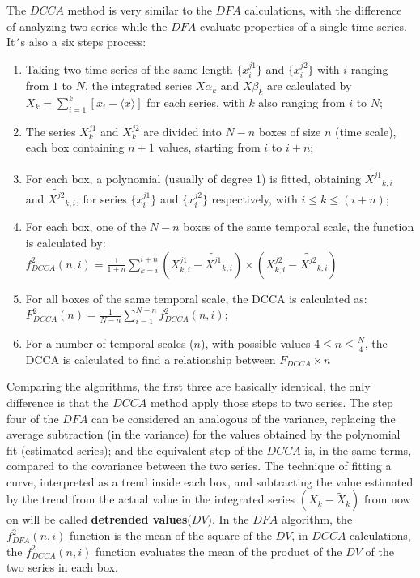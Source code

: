\documentclass[nojss]{jss}
\begin{document}
The $DCCA$ method is very similar to the $DFA$ calculations, with the difference of analyzing two series while the $DFA$ evaluate properties of a single time series. It´s also a six steps process:


\begin{enumerate}
  \label{steps:DCCA}
  \item Taking two time series of the same length $\{x^{j1}_{i}\}$ and $\{x^{j2}_{i}\}$ with $i$ ranging from $1$ to $N$, the integrated series $X\alpha_{k}$ and $X\beta_{k}$ are calculated by
  $X_{k} = \sum_{i=1}^{k}\left[x_{i} - \langle x \rangle \right] $ for each series, with $k$ also ranging from $i$ to $N$;
\item The series $X^{j1}_{k}$ and $X^{j2}_{k}$ are divided into $N - n$ boxes of size $n$ (time scale), each box containing $n + 1$ values, starting from $i$ to $i + n$;
\item For each box, a polynomial (usually of degree 1) is fitted, obtaining
  $\widetilde{X^{j1}}_{k, i}$ and $\widetilde{X^{j2}}_{k, i}$,
  for series $\{x^{j1}_{i}\}$ and $\{x^{j2}_{i}\}$ respectively,
  with $i \le k \le (i + n)$;
\item For each box, one of the $N - n$ boxes of the same temporal scale, the function is calculated by:\\[10pt]
  $f_{DCCA}^{2}(n, i) =
          \frac{1}{1+n} \sum_{k=i}^{i + n}(X^{j1}_{k,i}-\widetilde{X^{j1}}_{k, i}) \times (X^{j2}_{k,i}-\widetilde{X^{j2}}_{k, i})$
\item For all boxes of the same temporal scale, the DCCA is calculated as:\\[10pt]
  $F^2_{DCCA}(n) = \frac{1}{N - n} \sum_{i=1}^{N-n} f_{DCCA}^{2}(n, i)$;
\item For a number of temporal scales ($n$), with possible values $4 \le n \le \frac{N}{4}$, the DCCA is calculated to find a relationship between $F_{DCCA} \times n$
\end{enumerate}

Comparing the algorithms, the first three are basically identical, the only difference is that the $DCCA$ method apply those steps to two series. The step four of the $DFA$ can be considered an analogous of the variance, replacing the average subtraction (in the variance) for the values obtained by the polynomial fit (estimated series); and the equivalent step of the $DCCA$ is, in the same terms, compared to the covariance between the two series. The technique of fitting a curve, interpreted as a trend inside each box, and subtracting the value estimated by the trend from the actual value in the integrated series $(X_{k}-\widetilde{X}_{k})$ from now on will be called \textbf{detrended values}($DV$). In the $DFA$ algorithm, the $f_{DFA}^{2}(n, i)$ function is the mean of the square of the $DV$, in $DCCA$ calculations, the $f_{DCCA}^{2}(n, i)$ function evaluates the mean of the product of the $DV$ of the two series in each box.
\end{document}
